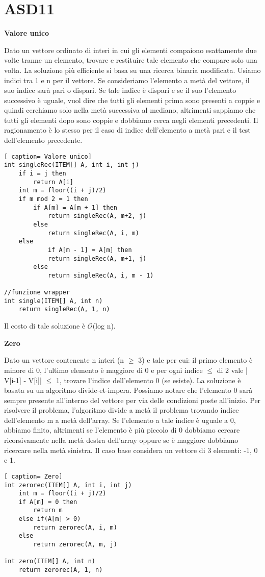 \documentclass[../cheatSheetAlgoritmi.tex]{subfiles}
\begin{document}
\section{ASD11}
\textbf{Valore unico}

Dato un vettore ordinato di interi in cui gli elementi compaiono esattamente due volte tranne un elemento, trovare e restituire tale elemento che compare solo una volta. La soluzione più efficiente si basa su una ricerca binaria modificata. Usiamo indici tra 1 e n per il vettore. Se consideriamo l'elemento a metà del vettore, il suo indice sarà pari o dispari. Se tale indice è dispari e se il suo l'elemento successivo è uguale, vuol dire che tutti gli elementi prima sono presenti a coppie e quindi cerchiamo solo nella  metà successiva al mediano, altrimenti sappiamo che tutti gli elementi dopo sono coppie e dobbiamo cerca negli elementi precedenti. Il ragionamento è lo stesso per il caso di indice dell'elemento a metà pari e il test dell'elemento precedente.
 
\begin{lstlisting}[ caption= Valore unico]
int singleRec(ITEM[] A, int i, int j)
	if i = j then
		return A[i]
	int m = floor((i + j)/2)
	if m mod 2 = 1 then
		if A[m] = A[m + 1] then
			return singleRec(A, m+2, j)
		else
			return singleRec(A, i, m)
	else
			if A[m - 1] = A[m] then
			return singleRec(A, m+1, j)
		else
			return singleRec(A, i, m - 1)
			
//funzione wrapper
int single(ITEM[] A, int n)
	return singleRec(A, 1, n)
\end{lstlisting}
Il costo di tale soluzione è $\mathcal{O}$(log n).

\bigskip

\textbf{Zero}

Dato un vettore contenente n interi (n $\geq$ 3) e tale per cui: il primo elemento è minore di 0, l'ultimo elemento è maggiore di 0 e per ogni indice $\leq$ di 2 vale | V[i-1] - V[i]| $\leq$ 1, trovare l'indice dell'elemento 0 (se esiste). La soluzione è basata su un algoritmo divide-et-impera. Possiamo notare che l'elemento 0 sarà sempre presente all'interno del vettore per via delle condizioni poste all'inizio. Per risolvere il problema, l'algoritmo divide a metà il problema trovando indice dell'elemento m a metà dell'array. Se l'elemento a tale indice è uguale a 0, abbiamo finito, altrimenti se l'elemento è più piccolo di 0 dobbiamo cercare ricorsivamente nella metà destra dell'array oppure se è maggiore dobbiamo ricercare nella metà sinistra. Il caso base considera un vettore di 3 elementi: -1, 0 e 1.
 
\begin{lstlisting}[ caption= Zero]
int zerorec(ITEM[] A, int i, int j)
	int m = floor((i + j)/2)
	if A[m] = 0 then
		return m
	else if(A[m] > 0)
		return zerorec(A, i, m)
	else
		return zerorec(A, m, j)
			
int zero(ITEM[] A, int n)
	return zerorec(A, 1, n)
\end{lstlisting}

 
\end{document}
